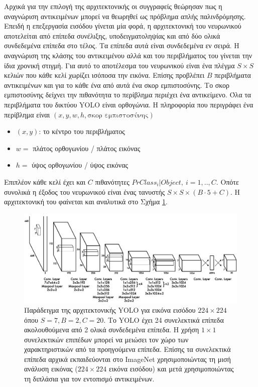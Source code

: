 Αρχικά για την επιλογή της αρχιτεκτονικής οι συγγραφείς θεώρησαν πως η αναγνώριση αντικειμένων μπορεί να θεωρηθεί ως πρόβλημα απλής παλινδρόμησης. Επειδή η επεξεργασία εισόδου γίνεται μία φορά, η αρχιτεκτονική του νευρωνικού αποτελείται από επίπεδα συνέλιξης, υποδειγματοληψίας και από δύο ολικά συνδεδεμένα επίπεδα στο τέλος. Τα επίπεδα αυτά είναι συνδεδεμένα εν σειρά. H αναγνώριση της κλάσης του αντικειμένου αλλά και του περιβλήματος του γίνεται την ίδια χρονική στιγμή. Για αυτό το αποτέλεσμα του νευρωνικού είναι ένα πλέγμα $ S \times S $ κελιών που κάθε κελί χωρίζει ισόποσα την εικόνα. Επίσης προβλέπει $Β$ περιβλήματα αντικειμένων και για το κάθε ένα από αυτά ένα σκορ εμπιστοσύνης. Το σκορ εμπιστοσύνης δείχνει την πιθανότητα το περίβλημα περιέχει ένα αντικείμενο. Όλα τα περιβλήματα του δικτύου YOLO είναι ορθογώνια. Η πληροφορία που περιγράφει ένα περίβλημα είναι $ (x, y, w, h, \text{σκορ εμπιστοσύνης}) $
\begin{itemize}
  \setlength\itemsep{0em}
\item[] $(x,y)$: το κέντρο του περιβλήματος
\item[] $w =$ πλάτος ορθογωνίου / πλάτος εικόνας
\item[] $h =$ ύψος ορθογωνίου / ύψος εικόνας
\end{itemize}

Επιπλέον κάθε κελί έχει και $C$ πιθανότητες $ Pr{Class_i| Object},\ i=1,..,C $. Οπότε συνολικά η έξοδος του νευρωνικού είναι ένας τανυστής $S\times S\times(B\cdot5+C)$. Η αρχιτεκτονική του φαίνεται και αναλυτικά στο Σχήμα \ref{fig:YOLO_architecture}.

\begin{figure}[H]
\centering
\includegraphics[width = \textwidth]{figures/YOLO/YOLO_architecture.png}
\caption[Αρχιτεκτονική YOLO]{Παράδειγμα της αρχιτεκτονικής YOLO \cite{6} για εικόνα εισόδου $224 \times 224$  όπου $S = 7, B = 2, C = 20 $. Το YOLO έχει 24 συνελεκτικά επίπεδα ακολουθούμενα από 2 ολικά συνδεδεμένα επίπεδα. Η χρήση $1 \times1 $ συνελεκτικών επιπέδων μπορεί να μειώσει τον χώρο των χαρακτηριστικών από τα προηγούμενα επίπεδα. Επίσης τα συνελεκτικά επίπεδα αρχικά εκπαιδεύονται στο ImageNet χρησιμοποιώντας τη μισή ανάλυση εικόνας ($224 \times 224$ εικόνα εισόδου) και μετά χρησιμοποιώντας τη διπλάσια για τον εντοπισμό αντικειμένων.}
\label{fig:YOLO_architecture}
\end{figure}

